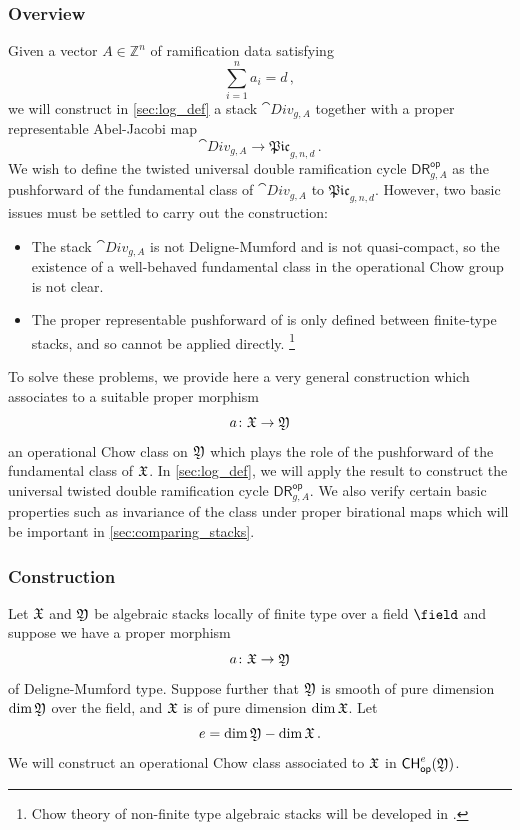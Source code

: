\documentclass[a4paper,12pt]{article} %
\newcommand{\bb}[1]{{\mathbb{#1}}}
\theoremstyle{definition}
\theoremstyle{plain}%
\newcommand{\Picabs}{\mathfrak{Pic}}
\newcommand{\Chow}{\mathsf{CH}}
\newcommand{\CHop}{\Chow_{\mathsf{op}}}
\newcommand{\DRop}{\mathsf{DR}^{\mathsf{op}}}
\begin{document}
\subsubsection{Overview}
Given a vector $A \in \bb Z^n$ of ramification data satisfying
$$\sum_{i=1}^n {a_i} =d\, ,$$
we will construct in \cref{sec:log_def} 
a stack $\cat{Div}_{g,A}$ together with a proper representable  Abel-Jacobi map 
$$\cat{Div}_{g,A} \to \Picabs_{g,n,d}\, .$$
We wish to define the twisted universal double ramification cycle $\DRop_{g,A}$ as the pushforward of the fundamental class of $\cat{Div}_{g,A}$ to $\Picabs_{g,n,d}$. 
However, two basic issues must be settled
to carry out the construction:
\begin{itemize}
\item[$\bullet$] The stack $\cat{Div}_{g,A}$ is not Deligne-Mumford and is not quasi-compact, so the existence of a well-behaved fundamental class in the operational Chow group is not clear. 
\item[$\bullet$] The proper representable pushforward of \cite[Appendix B]{BaeSchmitt1} is only defined between finite-type stacks, and so cannot be applied directly. \footnote{Chow theory of non-finite type algebraic stacks will be developed in \cite[Appendix A]{BaeSchmitt1}.}
\end{itemize}


To solve these problems, we provide here a very general construction which associates to a suitable proper morphism $$a\colon \frak X \to \frak Y$$ an operational Chow class on $\frak Y$ which plays the role of the pushforward of the fundamental class of $\frak X$. 
In \cref{sec:log_def}, we will apply the result to construct the universal twisted double ramification cycle $\DRop_{g,A}$. We also verify certain basic properties such as invariance of the class under proper birational maps which will be important in \cref{sec:comparing_stacks}. 

\subsubsection{Construction}\label{c44c}
Let $\frak X$ and $\frak Y$ be algebraic stacks locally of finite type over a field ${\field}$ and suppose we have a proper morphism $$a\colon \frak X \to \frak Y$$
of Deligne-Mumford type. 
Suppose further that $\frak Y$ is smooth of pure dimension $\dim \frak Y$ over the field, and $\frak X$ is of pure dimension $\dim \frak X$. Let 
$$e = \dim \frak Y-  \dim \frak X\, .$$
We  will construct an operational Chow class associated to $\frak X$ in $\CHop^e(\frak Y)$. 
\end{document}
